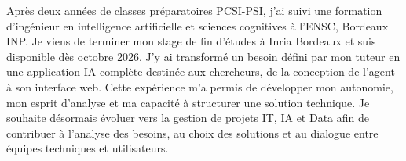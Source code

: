 
\begin{cvparagraph}
Après deux années de classes préparatoires PCSI-PSI, j’ai suivi une formation d’ingénieur en intelligence artificielle et sciences cognitives à l’ENSC, Bordeaux INP. Je viens de terminer mon stage de fin d’études à Inria Bordeaux et suis disponible dès octobre 2026. J’y ai transformé un besoin défini par mon tuteur en une application IA complète destinée aux chercheurs, de la conception de l’agent à son interface web. Cette expérience m’a permis de développer mon autonomie, mon esprit d’analyse et ma capacité à structurer une solution technique. Je souhaite désormais évoluer vers la gestion de projets IT, IA et Data afin de contribuer à l’analyse des besoins, au choix des solutions et au dialogue entre équipes techniques et utilisateurs.
\end{cvparagraph}
